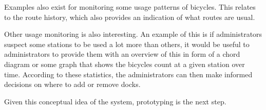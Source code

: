 Examples also exist for monitoring some usage patterns of bicycles.
This relates to the route history, which also provides an indication of what routes are usual.

Other usage monitoring is also interesting.
An example of this is if administrators suspect some stations to be used a lot more than others, it would be useful to administrators to provide them with an overview of this in form of a chord diagram or some graph that shows the bicycles count at a given station over time.
According to these statistics, the administrators can then make informed decisions on where to add or remove docks.

Given this conceptual idea of the system, prototyping is the next step.
